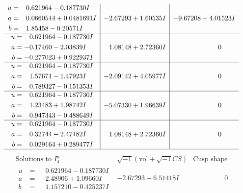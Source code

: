 \documentclass[1p]{elsarticle_modified}
\theoremstyle{definition}
\newcommand{\I}{\sqrt{-1}}
\begin{document}
$$\begin{array}{c|c|c}
\begin{aligned}
u &= \phantom{-}0.621964 - 0.187730 I \\
a &= \phantom{-}0.0660544 + 0.0481691 I \\
b &= \phantom{-}1.85458 - 0.20571 I\end{aligned}
 & -2.67293 + 1.60535 I & -9.67208 - 4.01523 I \\ \hline\begin{aligned}
u &= \phantom{-}0.621964 - 0.187730 I \\
a &= -0.17460 - 2.03839 I \\
b &= -0.277023 + 0.922937 I\end{aligned}
 & \phantom{-}1.08148 + 2.72360 I & \phantom{-0.000000 } 0 \\ \hline\begin{aligned}
u &= \phantom{-}0.621964 - 0.187730 I \\
a &= \phantom{-}1.57671 - 1.47923 I \\
b &= \phantom{-}0.789327 - 0.151353 I\end{aligned}
 & -2.09142 + 4.05977 I & \phantom{-0.000000 } 0 \\ \hline\begin{aligned}
u &= \phantom{-}0.621964 - 0.187730 I \\
a &= \phantom{-}1.23483 + 1.98742 I \\
b &= \phantom{-}0.947343 - 0.488649 I\end{aligned}
 & -5.07330 + 1.96639 I & \phantom{-0.000000 } 0 \\ \hline\begin{aligned}
u &= \phantom{-}0.621964 - 0.187730 I \\
a &= \phantom{-}0.32744 - 2.47182 I \\
b &= \phantom{-}0.029164 + 0.289477 I\end{aligned}
 & \phantom{-}1.08148 + 2.72360 I & \phantom{-0.000000 } 0\\
 \hline 
 \end{array}$$\newpage$$\begin{array}{c|c|c}  
\text{Solutions to }I^u_{4}& \I (\text{vol} + \sqrt{-1}CS) & \text{Cusp shape}\\
 \hline 
\begin{aligned}
u &= \phantom{-}0.621964 - 0.187730 I \\
a &= \phantom{-}2.48906 + 1.09660 I \\
b &= \phantom{-}1.157210 - 0.425237 I\end{aligned}
 & -2.67293 + 6.51418 I & \phantom{-0.000000 } 0 \\ \hline\begin{aligned}

\end{aligned}
\end{array}$$
\end{document}
